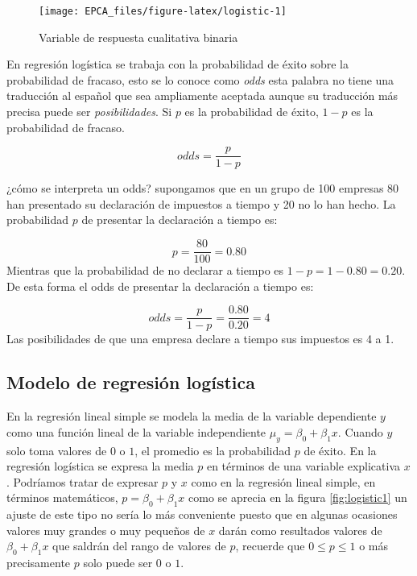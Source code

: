 \documentclass[
]{krantz}
\begin{document}
\begin{figure}[!h]

{\centering \texttt{[image: EPCA\_files/figure-latex/logistic-1]} 

}

\caption{Variable de respuesta cualitativa binaria}\label{fig:logistic}
\end{figure}

En regresión logística se trabaja con la probabilidad de éxito sobre la probabilidad de fracaso, esto se lo conoce como \emph{odds} esta palabra no tiene una traducción al español que sea ampliamente aceptada aunque su traducción más precisa puede ser \emph{posibilidades}. Si \(p\) es la probabilidad de éxito, \(1-p\) es la probabilidad de fracaso.

\begin{equation} 
  odds = \dfrac{p}{1-p}
  \label{eq:odds}
\end{equation}

¿cómo se interpreta un odds? supongamos que en un grupo de 100 empresas 80 han presentado su declaración de impuestos a tiempo y 20 no lo han hecho. La probabilidad \(p\) de presentar la declaración a tiempo es:

\[p=\dfrac{80}{100}=0.80\]
Mientras que la probabilidad de no declarar a tiempo es \(1-p=1-0.80=0.20\). De esta forma el odds de presentar la declaración a tiempo es:

\[ odds = \dfrac{p}{1-p} = \dfrac{0.80}{0.20}=4\]
Las posibilidades de que una empresa declare a tiempo sus impuestos es 4 a 1.

\hypertarget{modelo-de-regresion-logistica}{%
\subsection{Modelo de regresión logística}\label{modelo-de-regresion-logistica}}

En la regresión lineal simple se modela la media de la variable dependiente \(y\) como una función lineal de la variable independiente \(\mu_y=\beta_0+\beta_1x\). Cuando \(y\) solo toma valores de \(0\) o \(1\), el promedio es la probabilidad \(p\) de éxito. En la regresión logística se expresa la media \(p\) en términos de una variable explicativa \(x\). Podríamos tratar de expresar \(p\) y \(x\) como en la regresión lineal simple, en términos matemáticos, \(p=\beta_0+\beta_1x\) como se aprecia en la figura \ref{fig:logistic1} un ajuste de este tipo no sería lo más conveniente puesto que en algunas ocasiones valores muy grandes o muy pequeños de \(x\) darán como resultados valores de \(\beta_0+\beta_1x\) que saldrán del rango de valores de \(p\), recuerde que \(0\leq p \leq 1\) o más precisamente \(p\) solo puede ser \(0\) o \(1\).
\end{document}
